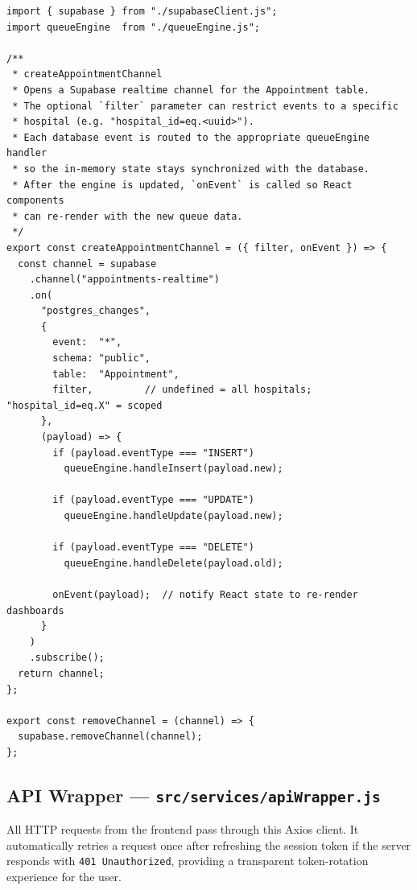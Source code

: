 \documentclass[12pt,onecolumn]{IEEEtran}
\begin{document}
\begin{lstlisting}[caption={Realtime service — Supabase channel subscription and queue engine wiring}]
import { supabase } from "./supabaseClient.js";
import queueEngine  from "./queueEngine.js";

/**
 * createAppointmentChannel
 * Opens a Supabase realtime channel for the Appointment table.
 * The optional `filter` parameter can restrict events to a specific
 * hospital (e.g. "hospital_id=eq.<uuid>").
 * Each database event is routed to the appropriate queueEngine handler
 * so the in-memory state stays synchronized with the database.
 * After the engine is updated, `onEvent` is called so React components
 * can re-render with the new queue data.
 */
export const createAppointmentChannel = ({ filter, onEvent }) => {
  const channel = supabase
    .channel("appointments-realtime")
    .on(
      "postgres_changes",
      {
        event:  "*",
        schema: "public",
        table:  "Appointment",
        filter,         // undefined = all hospitals; "hospital_id=eq.X" = scoped
      },
      (payload) => {
        if (payload.eventType === "INSERT")
          queueEngine.handleInsert(payload.new);

        if (payload.eventType === "UPDATE")
          queueEngine.handleUpdate(payload.new);

        if (payload.eventType === "DELETE")
          queueEngine.handleDelete(payload.old);

        onEvent(payload);  // notify React state to re-render dashboards
      }
    )
    .subscribe();
  return channel;
};

export const removeChannel = (channel) => {
  supabase.removeChannel(channel);
};
\end{lstlisting}

\subsection{API Wrapper — \texttt{src/services/apiWrapper.js}}
All HTTP requests from the frontend pass through this Axios client. It automatically retries a request once after refreshing the session token if the server responds with \texttt{401 Unauthorized}, providing a transparent token-rotation experience for the user.
\end{document}
